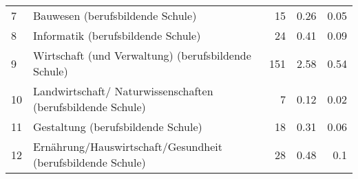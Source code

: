 \begin{longtable}{lXrrr}
     7 &
     \multicolumn{1}{X}{ Bauwesen (berufsbildende Schule)   } &


       \num{15} &
       \num[round-mode=places,round-precision=2]{0,26} &
         \num[round-mode=places,round-precision=2]{0,05} \\

     8 &
     \multicolumn{1}{X}{ Informatik (berufsbildende Schule)   } &


       \num{24} &
       \num[round-mode=places,round-precision=2]{0,41} &
         \num[round-mode=places,round-precision=2]{0,09} \\

     9 &
     \multicolumn{1}{X}{ Wirtschaft (und Verwaltung) (berufsbildende Schule)   } &


       \num{151} &
       \num[round-mode=places,round-precision=2]{2,58} &
         \num[round-mode=places,round-precision=2]{0,54} \\

     10 &
     \multicolumn{1}{X}{ Landwirtschaft/ Naturwissenschaften (berufsbildende Schule)   } &


       \num{7} &
       \num[round-mode=places,round-precision=2]{0,12} &
         \num[round-mode=places,round-precision=2]{0,02} \\

     11 &
     \multicolumn{1}{X}{ Gestaltung (berufsbildende Schule)   } &


       \num{18} &
       \num[round-mode=places,round-precision=2]{0,31} &
         \num[round-mode=places,round-precision=2]{0,06} \\

     12 &
     \multicolumn{1}{X}{ Ernährung/Hauswirtschaft/Gesundheit (berufsbildende Schule)   } &


       \num{28} &
       \num[round-mode=places,round-precision=2]{0,48} &
         \num[round-mode=places,round-precision=2]{0,1} \\


\end{longtable}
